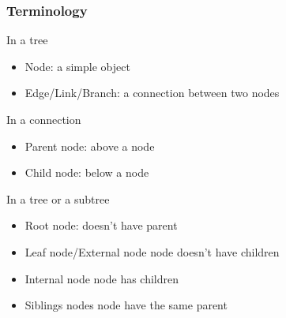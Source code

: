 \documentclass{article}
\begin{document}
\subsubsection{Terminology}
In a tree
\begin{itemize}
    \item Node: a simple object
    \item Edge/Link/Branch: a connection between two nodes
\end{itemize}

In a connection
\begin{itemize}
    \item Parent node: above a node
    \item Child node: below a node
\end{itemize}

In a tree or a subtree
\begin{itemize}
    \item Root node: doesn't have parent
    \item Leaf node/External node node doesn't have children
    \item Internal node node has children
    \item Siblings nodes node have the same parent
\end{itemize}
\end{document}
